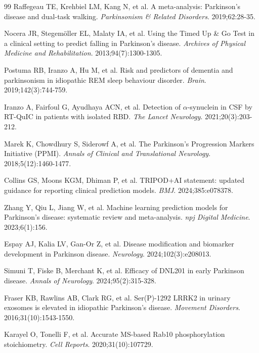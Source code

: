 \documentclass[11pt]{article}
\begin{document}
\begin{thebibliography}{99}
Raffegeau TE, Krehbiel LM, Kang N, et al. A meta-analysis: Parkinson's disease and dual-task walking. \textit{Parkinsonism \& Related Disorders}. 2019;62:28-35.

Nocera JR, Stegemöller EL, Malaty IA, et al. Using the Timed Up \& Go Test in a clinical setting to predict falling in Parkinson's disease. \textit{Archives of Physical Medicine and Rehabilitation}. 2013;94(7):1300-1305.

Postuma RB, Iranzo A, Hu M, et al. Risk and predictors of dementia and parkinsonism in idiopathic REM sleep behaviour disorder. \textit{Brain}. 2019;142(3):744-759.

Iranzo A, Fairfoul G, Ayudhaya ACN, et al. Detection of $\alpha$-synuclein in CSF by RT-QuIC in patients with isolated RBD. \textit{The Lancet Neurology}. 2021;20(3):203-212.

Marek K, Chowdhury S, Siderowf A, et al. The Parkinson's Progression Markers Initiative (PPMI). \textit{Annals of Clinical and Translational Neurology}. 2018;5(12):1460-1477.

Collins GS, Moons KGM, Dhiman P, et al. TRIPOD+AI statement: updated guidance for reporting clinical prediction models. \textit{BMJ}. 2024;385:e078378.

Zhang Y, Qiu L, Jiang W, et al. Machine learning prediction models for Parkinson's disease: systematic review and meta-analysis. \textit{npj Digital Medicine}. 2023;6(1):156.

Espay AJ, Kalia LV, Gan-Or Z, et al. Disease modification and biomarker development in Parkinson disease. \textit{Neurology}. 2024;102(3):e208013.

Simuni T, Fiske B, Merchant K, et al. Efficacy of DNL201 in early Parkinson disease. \textit{Annals of Neurology}. 2024;95(2):315-328.

Fraser KB, Rawlins AB, Clark RG, et al. Ser(P)-1292 LRRK2 in urinary exosomes is elevated in idiopathic Parkinson's disease. \textit{Movement Disorders}. 2016;31(10):1543-1550.

Karayel O, Tonelli F, et al. Accurate MS-based Rab10 phosphorylation stoichiometry. \textit{Cell Reports}. 2020;31(10):107729.

\end{thebibliography}
\end{document}

